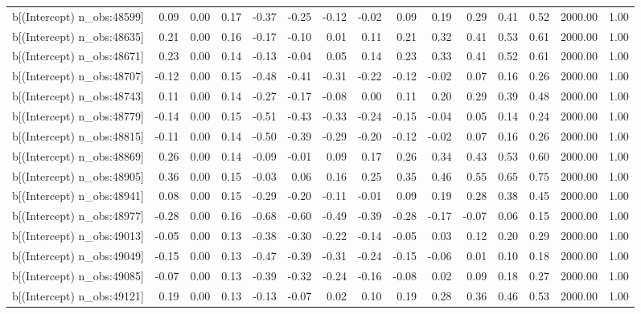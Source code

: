 \begin{table}[ht]
\begin{tabular}{rrrrrrrrrrrrrrr}
  b[(Intercept) n\_obs:48599] & 0.09 & 0.00 & 0.17 & -0.37 & -0.25 & -0.12 & -0.02 & 0.09 & 0.19 & 0.29 & 0.41 & 0.52 & 2000.00 & 1.00 \\ 
  b[(Intercept) n\_obs:48635] & 0.21 & 0.00 & 0.16 & -0.17 & -0.10 & 0.01 & 0.11 & 0.21 & 0.32 & 0.41 & 0.53 & 0.61 & 2000.00 & 1.00 \\ 
  b[(Intercept) n\_obs:48671] & 0.23 & 0.00 & 0.14 & -0.13 & -0.04 & 0.05 & 0.14 & 0.23 & 0.33 & 0.41 & 0.52 & 0.61 & 2000.00 & 1.00 \\ 
  b[(Intercept) n\_obs:48707] & -0.12 & 0.00 & 0.15 & -0.48 & -0.41 & -0.31 & -0.22 & -0.12 & -0.02 & 0.07 & 0.16 & 0.26 & 2000.00 & 1.00 \\ 
  b[(Intercept) n\_obs:48743] & 0.11 & 0.00 & 0.14 & -0.27 & -0.17 & -0.08 & 0.00 & 0.11 & 0.20 & 0.29 & 0.39 & 0.48 & 2000.00 & 1.00 \\ 
  b[(Intercept) n\_obs:48779] & -0.14 & 0.00 & 0.15 & -0.51 & -0.43 & -0.33 & -0.24 & -0.15 & -0.04 & 0.05 & 0.14 & 0.24 & 2000.00 & 1.00 \\ 
  b[(Intercept) n\_obs:48815] & -0.11 & 0.00 & 0.14 & -0.50 & -0.39 & -0.29 & -0.20 & -0.12 & -0.02 & 0.07 & 0.16 & 0.26 & 2000.00 & 1.00 \\ 
  b[(Intercept) n\_obs:48869] & 0.26 & 0.00 & 0.14 & -0.09 & -0.01 & 0.09 & 0.17 & 0.26 & 0.34 & 0.43 & 0.53 & 0.60 & 2000.00 & 1.00 \\ 
  b[(Intercept) n\_obs:48905] & 0.36 & 0.00 & 0.15 & -0.03 & 0.06 & 0.16 & 0.25 & 0.35 & 0.46 & 0.55 & 0.65 & 0.75 & 2000.00 & 1.00 \\ 
  b[(Intercept) n\_obs:48941] & 0.08 & 0.00 & 0.15 & -0.29 & -0.20 & -0.11 & -0.01 & 0.09 & 0.19 & 0.28 & 0.38 & 0.45 & 2000.00 & 1.00 \\ 
  b[(Intercept) n\_obs:48977] & -0.28 & 0.00 & 0.16 & -0.68 & -0.60 & -0.49 & -0.39 & -0.28 & -0.17 & -0.07 & 0.06 & 0.15 & 2000.00 & 1.00 \\ 
  b[(Intercept) n\_obs:49013] & -0.05 & 0.00 & 0.13 & -0.38 & -0.30 & -0.22 & -0.14 & -0.05 & 0.03 & 0.12 & 0.20 & 0.29 & 2000.00 & 1.00 \\ 
  b[(Intercept) n\_obs:49049] & -0.15 & 0.00 & 0.13 & -0.47 & -0.39 & -0.31 & -0.24 & -0.15 & -0.06 & 0.01 & 0.10 & 0.18 & 2000.00 & 1.00 \\ 
  b[(Intercept) n\_obs:49085] & -0.07 & 0.00 & 0.13 & -0.39 & -0.32 & -0.24 & -0.16 & -0.08 & 0.02 & 0.09 & 0.18 & 0.27 & 2000.00 & 1.00 \\ 
  b[(Intercept) n\_obs:49121] & 0.19 & 0.00 & 0.13 & -0.13 & -0.07 & 0.02 & 0.10 & 0.19 & 0.28 & 0.36 & 0.46 & 0.53 & 2000.00 & 1.00 \\ 

\end{tabular}
\end{table}

